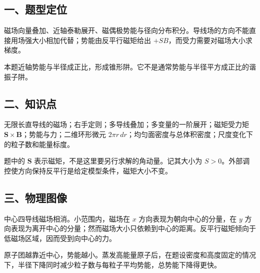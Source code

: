\documentclass[12pt,a4paper,fontset=fandol]{ctexart}
\begin{document}
\subsection{一、题型定位}\label{ux4e00ux9898ux578bux5b9aux4f4d-4}

磁场向量叠加、近轴泰勒展开、磁偶极势能与径向分布积分。导线场的方向不能直接用场强大小相加代替；势能由反平行磁矩给出
\(+SB\)，而受力需要对磁场大小求梯度。

本题近轴势能与半径成正比，形成锥形阱。它不是通常势能与半径平方成正比的谐振子阱。

\subsection{二、知识点}\label{ux4e8cux77e5ux8bc6ux70b9-4}

无限长直导线的磁场；右手定则；多导线叠加；多变量的一阶展开；磁矩受力矩
\(\boldsymbol S\times\boldsymbol B\)；势能与力；二维环形微元
\(2\pi r\,dr\)；均匀面密度与总体积密度；尺度变化下的粒子数和能量标度。

题中的 \(\boldsymbol S\)
表示磁矩，不是这里要另行求解的角动量。记其大小为
\(S>0\)。外部调控使方向保持反平行是给定模型条件，磁矩大小不变。

\subsection{三、物理图像}\label{ux4e09ux7269ux7406ux56feux50cf-4}

中心四导线磁场相消。小范围内，磁场在 \(x\) 方向表现为朝向中心的分量，在
\(y\)
方向表现为离开中心的分量；然而磁场大小只依赖到中心的距离。反平行磁矩倾向于低磁场区域，因而受到向中心的力。

原子团越靠近中心，势能越小。蒸发高能量原子后，在题设密度和高度固定的情况下，半径下降同时减少粒子数与每粒子平均势能，总势能下降得更快。
\end{document}
